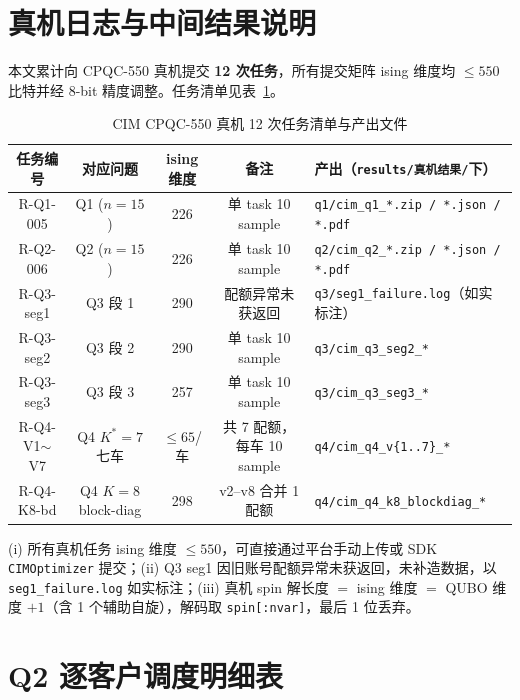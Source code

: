\documentclass[UTF8,12pt,a4paper]{ctexart}
\begin{document}
\section{真机日志与中间结果说明}
\label{app:cim}

本文累计向 CPQC-550 真机提交 \textbf{12 次任务}，所有提交矩阵 ising 维度均 $\le 550$ 比特并经 8-bit 精度调整。任务清单见表~\ref{tab:cim-tasks}。

\begin{table}[H]
    \centering\footnotesize
    \caption{CIM CPQC-550 真机 12 次任务清单与产出文件}
    \label{tab:cim-tasks}
    \begin{tabular}{c c c c l}
        \toprule
        任务编号 & 对应问题 & ising 维度 & 备注 & 产出（\texttt{results/真机结果/}下）\\
        \midrule
        R-Q1-005 & Q1 ($n=15$) & 226 & 单 task 10 sample & \texttt{q1/cim\_q1\_*.zip / *.json / *.pdf} \\
        R-Q2-006 & Q2 ($n=15$) & 226 & 单 task 10 sample & \texttt{q2/cim\_q2\_*.zip / *.json / *.pdf} \\
        R-Q3-seg1 & Q3 段 1 & 290 & 配额异常未获返回 & \texttt{q3/seg1\_failure.log}（如实标注）\\
        R-Q3-seg2 & Q3 段 2 & 290 & 单 task 10 sample & \texttt{q3/cim\_q3\_seg2\_*} \\
        R-Q3-seg3 & Q3 段 3 & 257 & 单 task 10 sample & \texttt{q3/cim\_q3\_seg3\_*} \\
        R-Q4-V1$\sim$V7 & Q4 $K^{*}=7$ 七车 & $\le 65$/车 & 共 7 配额，每车 10 sample & \texttt{q4/cim\_q4\_v\{1..7\}\_*} \\
        R-Q4-K8-bd & Q4 $K=8$ block-diag & 298 & v2--v8 合并 1 配额 & \texttt{q4/cim\_q4\_k8\_blockdiag\_*} \\
        \bottomrule
    \end{tabular}
\end{table}

(i) 所有真机任务 ising 维度 $\le 550$，可直接通过平台手动上传或 SDK \texttt{CIMOptimizer} 提交；(ii) Q3 seg1 因旧账号配额异常未获返回，未补造数据，以 \texttt{seg1\_failure.log} 如实标注；(iii) 真机 spin 解长度 $=$ ising 维度 $=$ QUBO 维度 $+1$（含 1 个辅助自旋），解码取 \texttt{spin[:nvar]}，最后 1 位丢弃。

\section{Q2 逐客户调度明细表}
\label{app:q2-schedule}
\end{document}
